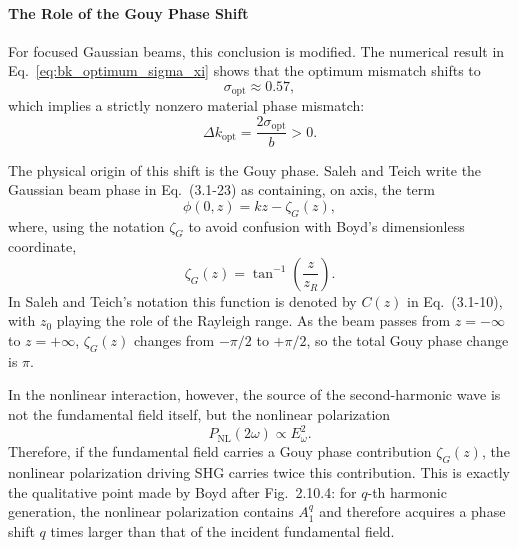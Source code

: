 \begin{resolucao}[Solution]
    \paragraph*{The Role of the Gouy Phase Shift}
        For focused Gaussian beams, this conclusion is modified. The numerical result in Eq.~\eqref{eq:bk_optimum_sigma_xi} shows that the optimum mismatch shifts to
        \begin{equation}
            \sigma_{\mathrm{opt}}\approx 0.57,
        \end{equation}
        which implies a strictly nonzero material phase mismatch:
        \begin{equation}
            \Delta k_{\mathrm{opt}}
            =
            \frac{2\sigma_{\mathrm{opt}}}{b}
            >
            0.
        \end{equation}

        The physical origin of this shift is the Gouy phase. Saleh and Teich write the Gaussian beam phase in Eq.~(3.1-23) as containing, on axis, the term
        \begin{equation}
            \phi(0,z)=kz-\zeta_G(z),
        \end{equation}
        where, using the notation $\zeta_G$ to avoid confusion with Boyd's dimensionless coordinate,
        \begin{equation}
            \zeta_G(z)
            =
            \tan^{-1}
            \left(
            \frac{z}{z_R}
            \right).
        \end{equation}
        In Saleh and Teich's notation this function is denoted by $C(z)$ in Eq.~(3.1-10), with $z_0$ playing the role of the Rayleigh range. As the beam passes from $z=-\infty$ to $z=+\infty$, $\zeta_G(z)$ changes from $-\pi/2$ to $+\pi/2$, so the total Gouy phase change is $\pi$.

        In the nonlinear interaction, however, the source of the second-harmonic wave is not the fundamental field itself, but the nonlinear polarization
        \begin{equation}
            P_{\mathrm{NL}}(2\omega)\propto E_\omega^2.
        \end{equation}
        Therefore, if the fundamental field carries a Gouy phase contribution $\zeta_G(z)$, the nonlinear polarization driving SHG carries twice this contribution. This is exactly the qualitative point made by Boyd after Fig.~2.10.4: for $q$-th harmonic generation, the nonlinear polarization contains $A_1^q$ and therefore acquires a phase shift $q$ times larger than that of the incident fundamental field.


\end{resolucao}
